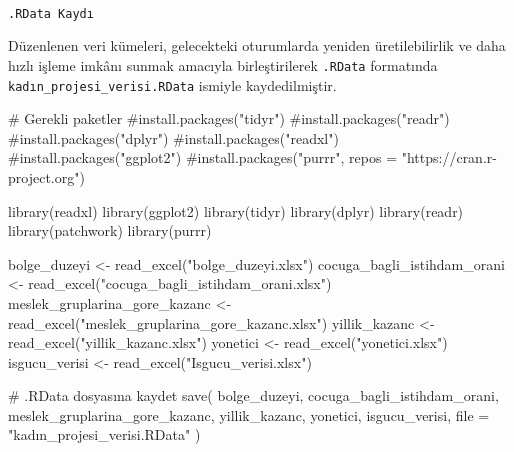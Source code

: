 \documentclass[
  11pt,
  a4paper,
  DIV=11,
  numbers=noendperiod]{scrartcl}
\makeatletter
\let\oldparagraph\paragraph
\renewcommand{\paragraph}{
    \@ifstar
      \xxxParagraphStar
      \xxxParagraphNoStar
  }
\newcommand{\xxxParagraphStar}[1]{\oldparagraph*{#1}\mbox{}}
\newcommand{\xxxParagraphNoStar}[1]{\oldparagraph{#1}\mbox{}}
\newenvironment{Shaded}{\begin{snugshade}}{\end{snugshade}}
\newcommand{\AttributeTok}[1]{\textcolor[rgb]{0.40,0.45,0.13}{#1}}
\newcommand{\CommentTok}[1]{\textcolor[rgb]{0.37,0.37,0.37}{#1}}
\newcommand{\FunctionTok}[1]{\textcolor[rgb]{0.28,0.35,0.67}{#1}}
\newcommand{\NormalTok}[1]{\textcolor[rgb]{0.00,0.23,0.31}{#1}}
\newcommand{\OtherTok}[1]{\textcolor[rgb]{0.00,0.23,0.31}{#1}}
\newcommand{\StringTok}[1]{\textcolor[rgb]{0.13,0.47,0.30}{#1}}
\makeatother
\begin{document}
\paragraph{\texorpdfstring{\texttt{.RData\ Kaydı}}{.RData Kaydı}}\label{rdata-kaydux131}

Düzenlenen veri kümeleri, gelecekteki oturumlarda yeniden
üretilebilirlik ve daha hızlı işleme imkânı sunmak amacıyla
birleştirilerek \texttt{.RData} formatında
\texttt{kadın\_projesi\_verisi.RData} ismiyle kaydedilmiştir.

\begin{Shaded}
\begin{Highlighting}[]
\CommentTok{\# Gerekli paketler}
\CommentTok{\#install.packages("tidyr")}
\CommentTok{\#install.packages("readr")}
\CommentTok{\#install.packages("dplyr")}
\CommentTok{\#install.packages("readxl")}
\CommentTok{\#install.packages("ggplot2")}
\CommentTok{\#install.packages("purrr", repos = "https://cran.r{-}project.org")}

\FunctionTok{library}\NormalTok{(readxl)}
\FunctionTok{library}\NormalTok{(ggplot2)}
\FunctionTok{library}\NormalTok{(tidyr)}
\FunctionTok{library}\NormalTok{(dplyr)}
\FunctionTok{library}\NormalTok{(readr)}
\FunctionTok{library}\NormalTok{(patchwork)}
\FunctionTok{library}\NormalTok{(purrr)}

\NormalTok{bolge\_duzeyi }\OtherTok{\textless{}{-}} \FunctionTok{read\_excel}\NormalTok{(}\StringTok{"bolge\_duzeyi.xlsx"}\NormalTok{)}
\NormalTok{cocuga\_bagli\_istihdam\_orani }\OtherTok{\textless{}{-}} \FunctionTok{read\_excel}\NormalTok{(}\StringTok{"cocuga\_bagli\_istihdam\_orani.xlsx"}\NormalTok{)}
\NormalTok{meslek\_gruplarina\_gore\_kazanc }\OtherTok{\textless{}{-}} \FunctionTok{read\_excel}\NormalTok{(}\StringTok{"meslek\_gruplarina\_gore\_kazanc.xlsx"}\NormalTok{)}
\NormalTok{yillik\_kazanc }\OtherTok{\textless{}{-}} \FunctionTok{read\_excel}\NormalTok{(}\StringTok{"yillik\_kazanc.xlsx"}\NormalTok{)}
\NormalTok{yonetici }\OtherTok{\textless{}{-}} \FunctionTok{read\_excel}\NormalTok{(}\StringTok{"yonetici.xlsx"}\NormalTok{)}
\NormalTok{isgucu\_verisi }\OtherTok{\textless{}{-}} \FunctionTok{read\_excel}\NormalTok{(}\StringTok{"Isgucu\_verisi.xlsx"}\NormalTok{)}

\CommentTok{\# .RData dosyasına kaydet}
\FunctionTok{save}\NormalTok{(}
\NormalTok{  bolge\_duzeyi,}
\NormalTok{  cocuga\_bagli\_istihdam\_orani,}
\NormalTok{  meslek\_gruplarina\_gore\_kazanc,}
\NormalTok{  yillik\_kazanc,}
\NormalTok{  yonetici,}
\NormalTok{  isgucu\_verisi,}
  \AttributeTok{file =} \StringTok{"kadın\_projesi\_verisi.RData"}
\NormalTok{)}
\end{Highlighting}
\end{Shaded}
\end{document}
